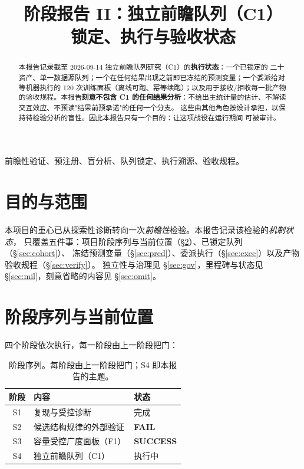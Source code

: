 \documentclass[conference]{IEEEtran}
\begin{document}
\title{阶段报告 II：独立前瞻队列（C1）\\锁定、执行与验收状态}

\author{
}

\maketitle

\begin{abstract}
本报告记录截至 2026-09-14 独立前瞻队列研究（C1）的\textbf{执行状态}：一个已锁定的
二十资产、单一数据源队列；一个在任何结果出现之前即已冻结的预测变量；一个委派给对等机器执行的
120 次训练面板（离线可跑、幂等续跑）；以及用于接收/拒收每一批产物的验收规程。本报告\textbf{刻意不包含
C1 的任何结果分析}：不给出主统计量的估计、不解读交互效应、不预读"结果前预承诺"的任何一个分支。
这些由其他角色按设计承担，以保持待检验分析的盲性。因此本报告只有一个目的：让这项战役在运行期间
可被审计。
\end{abstract}

\begin{IEEEkeywords}
前瞻性验证、预注册、盲分析、队列锁定、执行溯源、验收规程。
\end{IEEEkeywords}

\section{目的与范围}

本项目的重心已从探索性诊断转向一次\emph{前瞻性}检验。本报告记录该检验的\emph{机制状态}，
只覆盖五件事：项目阶段序列与当前位置（\S\ref{sec:seq}）、已锁定队列（\S\ref{sec:cohort}）、
冻结预测变量（\S\ref{sec:pred}）、委派执行（\S\ref{sec:exec}）以及产物验收规程（\S\ref{sec:verify}）。
独立性与治理见 \S\ref{sec:gov}，里程碑与状态见 \S\ref{sec:mil}，刻意省略的内容见 \S\ref{sec:omit}。

\section{阶段序列与当前位置}
\label{sec:seq}

四个阶段依次执行，每一阶段由上一阶段把门：

\begin{table}[!t]
\centering
\small
\begin{tabular}{@{}cll@{}}
\toprule
阶段 & 内容 & 状态 \\
\midrule
S1 & 复现与受控诊断 & 完成 \\
S2 & 候选结构规律的外部验证 & \textbf{FAIL} \\
S3 & 容量受控广度面板（F1） & \textbf{SUCCESS} \\
S4 & 独立前瞻队列（C1） & 执行中 \\
\bottomrule
\end{tabular}
\caption{阶段序列。每阶段由上一阶段把门；S4 即本报告的主题。}
\label{tab:seq}
\end{table}
\end{document}
